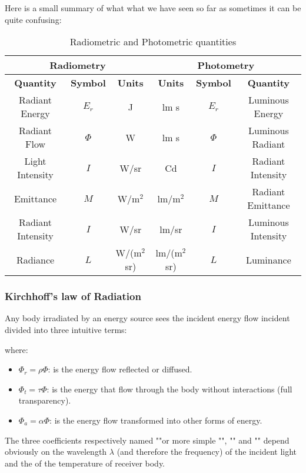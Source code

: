 	Here is a small summary of what what we have seen so far as sometimes it can be quite confusing:
	\begin{table}[H]
	\begin{center}
		\begin{tabular}{|c|c|c||c|c|c|}
			\hline
			\multicolumn{3}{|c|}{\cellcolor{black!30}\textbf{Radiometry}} & \multicolumn{3}{|c|}{\cellcolor{black!30}\textbf{Photometry}}\\
			\hline
			\cellcolor{black!30}\textbf{Quantity} & \cellcolor{black!30}\textbf{Symbol} & \cellcolor{black!30}\textbf{Units} & \cellcolor{black!30}\textbf{Units} & \cellcolor{black!30}\textbf{Symbol} & \cellcolor{black!30}\textbf{Quantity}  \\
			\hline
			Radiant Energy & $E_r$ & J & lm s & $E_r$ & Luminous Energy \\
			\hline
			Radiant Flow & $\Phi$ & W & lm s & $\Phi$ & Luminous Radiant \\
			\hline
			Light Intensity & $I$ & W/sr & Cd & $I$ & Radiant Intensity \\
			\hline
			Emittance & $M$ & W/m$^2$ & lm/m$^2$ & $M$ & Radiant Emittance \\
			\hline
			Radiant Intensity & $I$ & W/sr & lm/sr & $I$ & Luminous Intensity\\
			\hline
			Radiance & $L$ & W/(m$^2$sr) & lm/(m$^2$sr) & $L$ & Luminance\\
			\hline
		\end{tabular}
		\caption[]{Radiometric and Photometric quantities}
	\end{center}
	\end{table}
	
	\pagebreak
	\subsubsection{Kirchhoff's law of Radiation}\label{kirchhoff law of radiation}
	Any body irradiated by an energy source sees the incident energy flow incident divided into three intuitive terms:
	
	where:
	\begin{itemize}
		\item $\Phi_r=\rho\Phi$: is the energy flow reflected or diffused.

		\item $\Phi_t=\tau\Phi$: is the energy that flow through the body without interactions (full transparency).

		\item $\Phi_a=\alpha\Phi$: is the energy flow transformed into other forms of energy.
	\end{itemize}
	The three coefficients respectively named ""or more simple "", "" and "" depend obviously on the wavelength $\lambda$ (and therefore the frequency) of the incident light and the of the temperature of receiver body.
	
